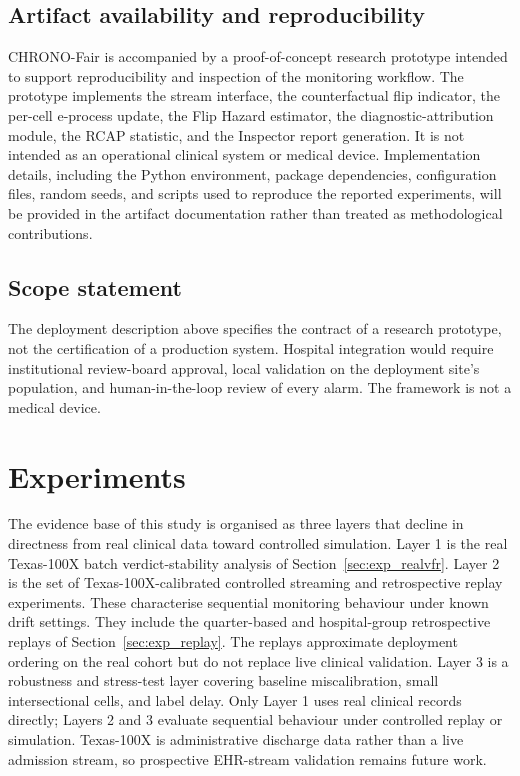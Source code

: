 \documentclass[acmsmall,nonacm,review,anonymous]{acmart}
\newcommand{\1}[1]{\mathbf{1}\!\left\{#1\right\}}
\begin{document}
\subsection{Artifact availability and reproducibility}\label{sec:artifact}

CHRONO-Fair is accompanied by a proof-of-concept research prototype intended to support reproducibility and inspection of the monitoring workflow. The prototype implements the stream interface, the counterfactual flip indicator, the per-cell e-process update, the Flip Hazard estimator, the diagnostic-attribution module, the RCAP statistic, and the Inspector report generation. It is not intended as an operational clinical system or medical device. Implementation details, including the Python environment, package dependencies, configuration files, random seeds, and scripts used to reproduce the reported experiments, will be provided in the artifact documentation rather than treated as methodological contributions.

\subsection{Scope statement}

The deployment description above specifies the contract of a research prototype, not the certification of a production system. Hospital integration would require institutional review-board approval, local validation on the deployment site's population, and human-in-the-loop review of every alarm. The framework is not a medical device.

\section{Experiments}\label{sec:experiments}

The evidence base of this study is organised as three layers that decline in directness from real clinical data toward controlled simulation. Layer 1 is the real Texas-100X batch verdict-stability analysis of Section~\ref{sec:exp_realvfr}. Layer 2 is the set of Texas-100X-calibrated controlled streaming and retrospective replay experiments. These characterise sequential monitoring behaviour under known drift settings. They include the quarter-based and hospital-group retrospective replays of Section~\ref{sec:exp_replay}. The replays approximate deployment ordering on the real cohort but do not replace live clinical validation. Layer 3 is a robustness and stress-test layer covering baseline miscalibration, small intersectional cells, and label delay. Only Layer 1 uses real clinical records directly; Layers 2 and 3 evaluate sequential behaviour under controlled replay or simulation. Texas-100X is administrative discharge data rather than a live admission stream, so prospective EHR-stream validation remains future work.
\end{document}
